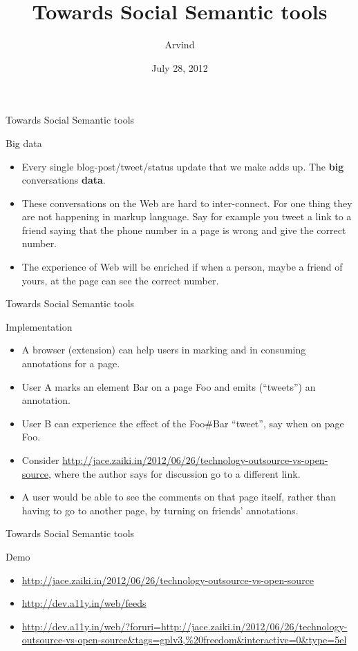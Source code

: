 \documentclass[''urlcolor=red'']{beamer}
\title{Towards Social Semantic tools}
\author{Arvind}
\date{July 28, 2012}
\begin{document}
\begin{frame}
  \titlepage
\end{frame}

\begin{frame}{Towards Social Semantic tools}
  \begin{block}{Big data}
    \begin{itemize}
    \item Every single blog-post/tweet/status update that we make adds up.  The \textbf{big} conversations \textbf{data}.
    \item These conversations on the Web are hard to inter-connect.  For one thing they are not happening in markup language.  Say for example you tweet a link to a friend saying that the phone number in a page is wrong and give the correct number.
    \item The experience of Web will be enriched if when a person, maybe a friend of yours, at the page can see the correct number.
    \end{itemize}
  \end{block}
\end{frame}

\begin{frame}{Towards Social Semantic tools}
  \begin{block}{Implementation}
    \begin{itemize}
    \item A browser (extension) can help users in marking and in consuming annotations for a page.
    \item User A marks an element Bar on a page Foo and emits (``tweets'') an annotation.
    \item User B can experience the effect of the Foo\#Bar ``tweet'', say when on page Foo.
    \item Consider \url{http://jace.zaiki.in/2012/06/26/technology-outsource-vs-open-source}, where the author says for discussion go to a different link.
    \item A user would be able to see the comments on that page itself, rather than having to go to another page, by turning on friends' annotations.
    \end{itemize}
  \end{block}
\end{frame}

\begin{frame}{Towards Social Semantic tools}
  \begin{block}{Demo}
    \begin{itemize}
    \item \url{http://jace.zaiki.in/2012/06/26/technology-outsource-vs-open-source}
    \item \url{http://dev.a11y.in/web/feeds}
    \item \url{http://dev.a11y.in/web/?foruri=http://jace.zaiki.in/2012/06/26/technology-outsource-vs-open-source&tags=gplv3,\%20freedom&interactive=0&type=5el}
    \end{itemize}
  \end{block}
\end{frame}
\end{document}
